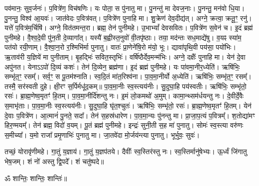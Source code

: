 पव॑मानः॒ सुव॒र्जनः॑। प॒वित्रे॑ण॒ विच॑\ur{}षणिः। यः पोता॒ स पु॑नातु मा। पु॒नन्तु॑ मा देवज॒नाः।
पु॒नन्तु॒ मन॑वो धि॒या। पु॒नन्तु॒ विश्व॑ आ॒यवः॑। जात॑वेदः प॒वित्र॑वत्। प॒वित्रे॑ण पुनाहि मा।
शु॒क्रेण॑ देव॒दीद्य॑त्। अग्ने॒ क्रत्वा॒ क्रतू॒ꣳ॒ रनु॑। यत्ते॑ प॒वित्र॑म॒र्चिषि॑। अग्ने॒ वित॑तमन्त॒रा।
ब्रह्म॒ तेन॑ पुनीमहे। उ॒भाभ्यां᳚ देवसवितः। प॒वित्रे॑ण स॒वेन॑ च। इ॒दं ब्रह्म॑ पुनीमहे।
वै॒श्व॒दे॒वी पु॑न॒ती दे॒व्यागा᳚त्। यस्यै॑ ब॒ह्वीस्त॒नुवो॑ वी॒तपृ॑ष्ठाः।
तया॒ मद॑न्तः सध॒माद्ये॑षु। व॒यꣴ स्या॑म॒ पत॑यो रयी॒णाम्।
वै॒श्वा॒न॒रो र॒श्मिभि॑र्मा पुनातु। वातः॑ प्रा॒णेने॑षि॒रो म॑यो॒ भूः।
द्यावा॑पृथि॒वी पय॑सा॒ पयो॑भिः। ऋ॒ताव॑री य॒ज्ञिये॑ मा पुनीताम्।
बृ॒हद्भिः॑ सवित॒स्तृभिः॑। वर्{}षि॑ष्ठैर्देव॒मन्म॑भिः।
अग्ने॒ दक्षैः᳚ पुनाहि मा। येन॑ दे॒वा अपु॑नत।
येनाऽऽपो॑ दि॒व्यं कशः॑। तेन॑ दि॒व्येन॒ ब्रह्म॑णा। इ॒दं ब्रह्म॑ पुनीमहे। यः पा॑वमा॒नीर॒ध्येति॑।
ऋषि॑भिः॒ सम्भृ॑त॒ꣳ॒ रसम्᳚। सर्व॒ꣳ॒ स पू॒तम॑श्नाति।
स्व॒दि॒तं मा॑त॒रिश्व॑ना। पा॒व॒मा॒नीर्यो अ॒ध्येति॑।
ऋषि॑भिः॒ सम्भृ॑त॒ꣳ॒ रसम्᳚। तस्मै॒ सर॑स्वती दुहे। क्षी॒रꣳ स॒र्पिर्मधू॑द॒कम्॥
पा॒व॒मा॒नीः स्व॒स्त्यय॑नीः। सु॒दुघा॒हि पय॑स्वतीः।
ऋषि॑भिः॒ सम्भृ॑तो॒ रसः॑। ब्रा॒ह्म॒णेष्व॒मृतꣳ॑ हि॒तम्।
पा॒व॒मा॒नीर्दि॑शन्तु नः। इ॒मं लो॒कमथो॑ अ॒मुम्।
कामा॒न्थ्सम॑र्धयन्तु नः। दे॒वीर्दे॒वैः स॒माभृ॑ताः।
पा॒व॒मा॒नीः स्व॒स्त्यय॑नीः। सु॒दुघा॒हि घृ॑त॒श्चुतः॑।
ऋषि॑भिः॒ सम्भृ॑तो॒ रसः॑। ब्रा॒ह्म॒णेष्व॒मृतꣳ॑ हि॒तम्।
येन॑ दे॒वाः प॒वित्रे॑ण। आ॒त्मानं॑ पु॒नते॒ सदा᳚।
तेन॑ स॒हस्र॑धारेण। पा॒व॒मा॒न्यः पु॑नन्तु मा।
प्रा॒जा॒प॒त्यं प॒वित्रम्᳚। श॒तोद्या॑मꣳ हिर॒ण्मयम्᳚।
तेन॑ ब्रह्म॒ विदो॑ व॒यम्। पू॒तं ब्रह्म॑ पुनीमहे।
इन्द्रः॑ सुनी॒ती स॒ह मा॑ पुनातु। सोमः॑ स्व॒स्त्या वरु॑णः स॒मीच्या᳚।
य॒मो राजा᳚ प्रमृ॒णाभिः॑ पुनातु मा। जा॒तवे॑दा मो॒र्जय॑न्त्या पुनातु। भूर्भुवः॒ सुवः॑।

तच्छं॒ योरावृ॑णीमहे। गा॒तुं य॒ज्ञाय॑। गा॒तुं य॒ज्ञप॑तये। दैवीः᳚ स्व॒स्तिर॑स्तु नः।
स्व॒स्तिर्मानु॑षेभ्यः। ऊ॒र्ध्वं जि॑गातु भेष॒जम्। शं नो॑ अस्तु द्वि॒पदे᳚। शं चतु॑ष्पदे॥

\centerline{ॐ शान्तिः॒ शान्तिः॒ शान्तिः॑॥}
